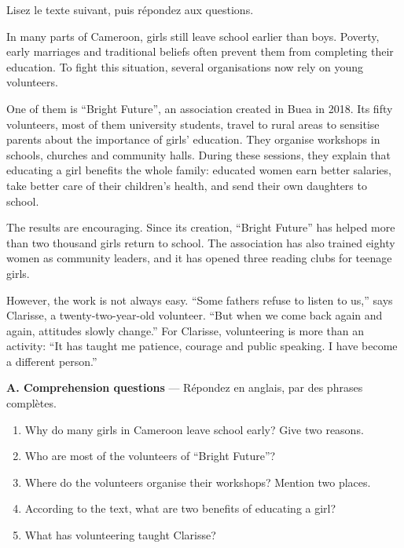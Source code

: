 \documentclass[11pt]{article}
\begin{document}
\begin{exercice}
Lisez le texte suivant, puis répondez aux questions.

\begin{textebox}
In many parts of Cameroon, girls still leave school earlier than boys. Poverty, early marriages and traditional beliefs often prevent them from completing their education. To fight this situation, several organisations now rely on young volunteers.

One of them is “Bright Future”, an association created in Buea in 2018. Its fifty volunteers, most of them university students, travel to rural areas to sensitise parents about the importance of girls' education. They organise workshops in schools, churches and community halls. During these sessions, they explain that educating a girl benefits the whole family: educated women earn better salaries, take better care of their children's health, and send their own daughters to school.

The results are encouraging. Since its creation, “Bright Future” has helped more than two thousand girls return to school. The association has also trained eighty women as community leaders, and it has opened three reading clubs for teenage girls.

However, the work is not always easy. “Some fathers refuse to listen to us,” says Clarisse, a twenty-two-year-old volunteer. “But when we come back again and again, attitudes slowly change.” For Clarisse, volunteering is more than an activity: “It has taught me patience, courage and public speaking. I have become a different person.”
\end{textebox}

\textbf{A. Comprehension questions} — Répondez en anglais, par des phrases complètes.

\begin{enumerate}
\item Why do many girls in Cameroon leave school early? Give two reasons.
\item Who are most of the volunteers of “Bright Future”?
\item Where do the volunteers organise their workshops? Mention two places.
\item According to the text, what are two benefits of educating a girl?
\item What has volunteering taught Clarisse?
\end{enumerate}


\end{exercice}
\end{document}
